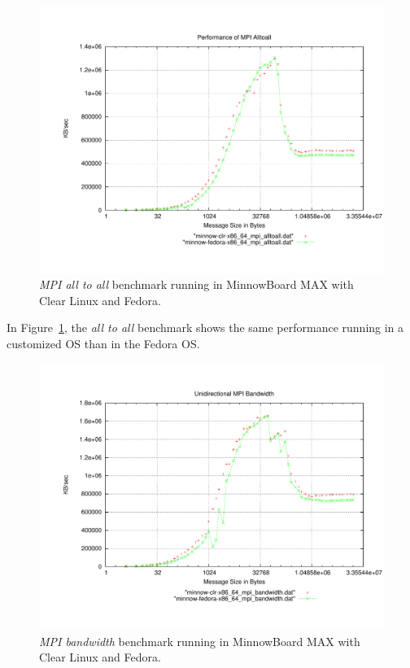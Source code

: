 \begin{figure}[H]
\centering
\includegraphics[width=1 \textwidth]{images/mpbench_clr_experiments/mpi_alltoall.pdf}
\caption{\textit{MPI all to all} benchmark running in MinnowBoard MAX with Clear Linux and
Fedora.}
\label{mpi_alltoall_clr_fedora}
\end{figure}

In Figure~\ref{mpi_alltoall_clr_fedora}, the \textit{all to all} benchmark
shows the same performance running in a customized OS than in the Fedora OS. 

\begin{figure}[H]
\centering
\includegraphics[width=1 \textwidth]{images/mpbench_clr_experiments/mpi_bandwidth.pdf}
\caption{\textit{MPI bandwidth} benchmark running in MinnowBoard MAX with Clear Linux and
Fedora.}
\label{mpi_bandwidth_clr_fedora}
\end{figure}

